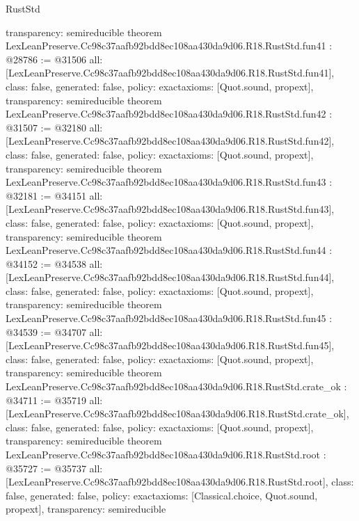 \begin{lexlean}{RustStd}
\begin{coremodule}
{  transparency: semireducible
}
theorem LexLeanPreserve.Cc98c37aafb92bdd8ec108aa430da9d06.R18.RustStd.fun41 : @28786 := @31506 {
  all: [LexLeanPreserve.Cc98c37aafb92bdd8ec108aa430da9d06.R18.RustStd.fun41],
  class: false,
  generated: false,
  policy: exact{axioms: [Quot.sound, propext]},
  transparency: semireducible
}
theorem LexLeanPreserve.Cc98c37aafb92bdd8ec108aa430da9d06.R18.RustStd.fun42 : @31507 := @32180 {
  all: [LexLeanPreserve.Cc98c37aafb92bdd8ec108aa430da9d06.R18.RustStd.fun42],
  class: false,
  generated: false,
  policy: exact{axioms: [Quot.sound, propext]},
  transparency: semireducible
}
theorem LexLeanPreserve.Cc98c37aafb92bdd8ec108aa430da9d06.R18.RustStd.fun43 : @32181 := @34151 {
  all: [LexLeanPreserve.Cc98c37aafb92bdd8ec108aa430da9d06.R18.RustStd.fun43],
  class: false,
  generated: false,
  policy: exact{axioms: [Quot.sound, propext]},
  transparency: semireducible
}
theorem LexLeanPreserve.Cc98c37aafb92bdd8ec108aa430da9d06.R18.RustStd.fun44 : @34152 := @34538 {
  all: [LexLeanPreserve.Cc98c37aafb92bdd8ec108aa430da9d06.R18.RustStd.fun44],
  class: false,
  generated: false,
  policy: exact{axioms: [Quot.sound, propext]},
  transparency: semireducible
}
theorem LexLeanPreserve.Cc98c37aafb92bdd8ec108aa430da9d06.R18.RustStd.fun45 : @34539 := @34707 {
  all: [LexLeanPreserve.Cc98c37aafb92bdd8ec108aa430da9d06.R18.RustStd.fun45],
  class: false,
  generated: false,
  policy: exact{axioms: [Quot.sound, propext]},
  transparency: semireducible
}
theorem LexLeanPreserve.Cc98c37aafb92bdd8ec108aa430da9d06.R18.RustStd.crate_ok : @34711 := @35719 {
  all: [LexLeanPreserve.Cc98c37aafb92bdd8ec108aa430da9d06.R18.RustStd.crate_ok],
  class: false,
  generated: false,
  policy: exact{axioms: [Quot.sound, propext]},
  transparency: semireducible
}
theorem LexLeanPreserve.Cc98c37aafb92bdd8ec108aa430da9d06.R18.RustStd.root : @35727 := @35737 {
  all: [LexLeanPreserve.Cc98c37aafb92bdd8ec108aa430da9d06.R18.RustStd.root],
  class: false,
  generated: false,
  policy: exact{axioms: [Classical.choice, Quot.sound, propext]},
  transparency: semireducible
}


\end{coremodule}
\end{lexlean}
